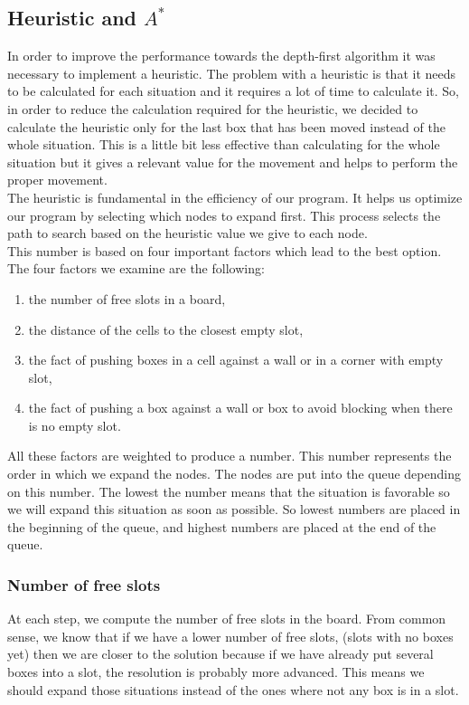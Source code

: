 \documentclass[journal]{IEEEtran}
\begin{document}
\subsection{Heuristic and $A^*$}
In order to improve the performance towards the depth-first algorithm it was necessary to implement a heuristic. The problem with a heuristic is that it needs to be calculated for each situation and it requires a lot of time to calculate it. So, in order to reduce the calculation required for the heuristic, we decided to calculate the heuristic only for the last box that has been moved instead of the whole situation. This is a little bit less effective than calculating for the whole situation but it gives a relevant value for the movement and helps to perform the proper movement.\\
The heuristic is fundamental in the efficiency of our program. It helps us optimize our program by selecting which nodes to expand first. This process selects the path to search based on the heuristic value we give to each node.\\
This number is based on four important factors which lead to the best option. The four factors we examine are the following:
\begin{enumerate}
 \item the number of free slots in a board,
 \item the distance of the cells to the closest empty slot,
 \item the fact of pushing boxes in a cell against a wall or in a corner with empty slot,
 \item the fact of pushing a box against a wall or box to avoid blocking when there is no empty slot.\\
\end{enumerate}
All these factors are weighted to produce a number. This number represents the order in which we expand the nodes. The nodes are put into the queue depending on this number. The lowest the number means that the situation is favorable so we will expand this situation as soon as possible. So lowest numbers are placed in the beginning of the queue, and highest numbers are placed at the end of the queue.

\subsubsection{Number of free slots}
At each step, we compute the number of free slots in the board. From common sense, we know that if we have a lower number of free slots, (slots with no boxes yet) then we are closer to the solution because if we have already put several boxes into a slot, the resolution is probably more advanced. This means we should expand those situations instead of the ones where not any box is in a slot.
\end{document}
